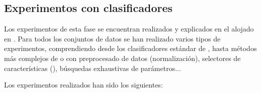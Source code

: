 \subsection{Experimentos con clasificadores}\label{subs:expprimfase}
Los experimentos de esta fase se encuentran realizados y explicados en el  alojado en . Para todos los conjuntos de datos se han realizado varios tipos de experimentos, comprendiendo desde los clasificadores estándar de , hasta métodos más complejos de  o  con preprocesado de datos (normalización), selectores de características (), búsquedas exhaustivas de parámetros... 

Los experimentos realizados han sido los siguientes:
